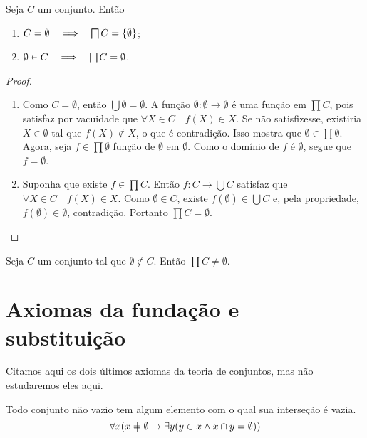 \begin{proposition}
Seja $C$ um conjunto. Então
	\begin{enumerate}
	\item $C = \emptyset \entao \prod C = \{\emptyset\}$;
	\item $\emptyset \in C \entao \prod C = \emptyset$.
	\end{enumerate}
\end{proposition}
\begin{proof}
	\begin{enumerate}
	\item Como $C=\emptyset$, então $\bigcup \emptyset = \emptyset$. A função $\emptyset: \emptyset \to \emptyset$ é uma função em $\prod C$, pois satisfaz por vacuidade que $\forall X \in C \quad f(X) \in X$. Se não satisfizesse, existiria $X \in \emptyset$ tal que $f(X) \notin X$, o que é contradição. Isso mostra que $\emptyset \in \prod \emptyset$. Agora, seja $f \in \prod \emptyset$ função de $\emptyset$ em $\emptyset$. Como o domínio de $f$ é $\emptyset$, segue que $f=\emptyset$.

	\item Suponha que existe $f \in \prod C$. Então $f: C \to \bigcup C$ satisfaz que $\forall X \in C \quad f(X) \in X$. Como $\emptyset \in C$, existe $f(\emptyset) \in \bigcup C$ e, pela propriedade, $f(\emptyset) \in \emptyset$, contradição. Portanto $\prod C = \emptyset$.
	\end{enumerate}
\end{proof}

\begin{axiom}[Escolha]
Seja $C$ um conjunto tal que $\emptyset \notin C$. Então $\prod C \neq \emptyset$.
\end{axiom}


\section{Axiomas da fundação e substituição}

Citamos aqui os dois últimos axiomas da teoria de conjuntos, mas não estudaremos eles aqui.

\begin{axiom}[Fundação]
Todo conjunto não vazio tem algum elemento com o qual sua interseção é vazia.
	\begin{equation*}
	\forall x(x \neq \emptyset \limplica \exists y(y \in x \lee x \cap y = \emptyset))
	\end{equation*}
\end{axiom}


